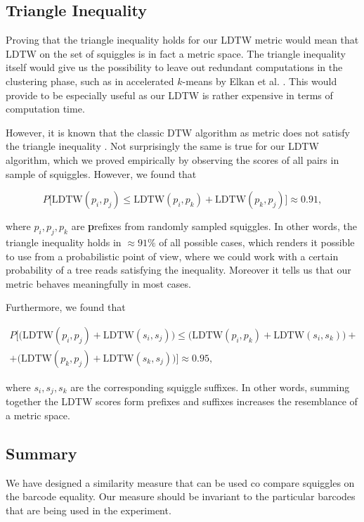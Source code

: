 \subsection{Triangle Inequality}
Proving that the triangle inequality holds for our LDTW metric would mean that LDTW on the set of squiggles is in fact a metric space. The triangle inequality itself would give us the possibility to leave out redundant computations in the clustering phase, such as in accelerated $k$-means by Elkan et al. \cite{elkan2003using}. This would provide to be especially useful as our LDTW is rather expensive in terms of computation time.

However, it is known that the classic DTW algorithm as metric does not satisfy the triangle inequality \cite{yi1998efficient}. Not surprisingly the same is true for our LDTW algorithm, which we proved empirically by observing the scores of all pairs in sample of squiggles. However, we found that

\begin{equation}
    P \Big[ \text{LDTW}(p_i, p_j) \leq \text{LDTW}(p_i, p_k) + \text{LDTW}(p_k, p_j) \Big] \approx 0.91,
\end{equation}

where $p_i, p_j, p_k$ are \textbf{p}refixes from randomly sampled squiggles. In other words, the triangle inequality holds in $\approx 91\%$ of all possible cases, which renders it possible to use from a probabilistic point of view, where we could work with a certain probability of a tree reads satisfying the inequality. Moreover it tells us that our metric behaves meaningfully in most cases.

Furthermore, we found that

\begin{multline}
    P \Big[ \big( \text{LDTW}(p_i, p_j) + \text{LDTW}(s_i, s_j) \big) \leq \big( \text{LDTW}(p_i, p_k) + \text{LDTW}(s_i, s_k) \big) + \\ + \big( \text{LDTW}(p_k, p_j) + \text{LDTW}(s_k, s_j) \big) \Big] \approx 0.95,
\end{multline}

where $s_i, s_j, s_k$ are the corresponding squiggle suffixes. In other words, summing together the LDTW scores form prefixes and suffixes increases the resemblance of a metric space.

\subsection{Summary}
We have designed a similarity measure that can be used co compare squiggles on the barcode equality.
Our measure should be invariant to the particular barcodes that are being used in the experiment.